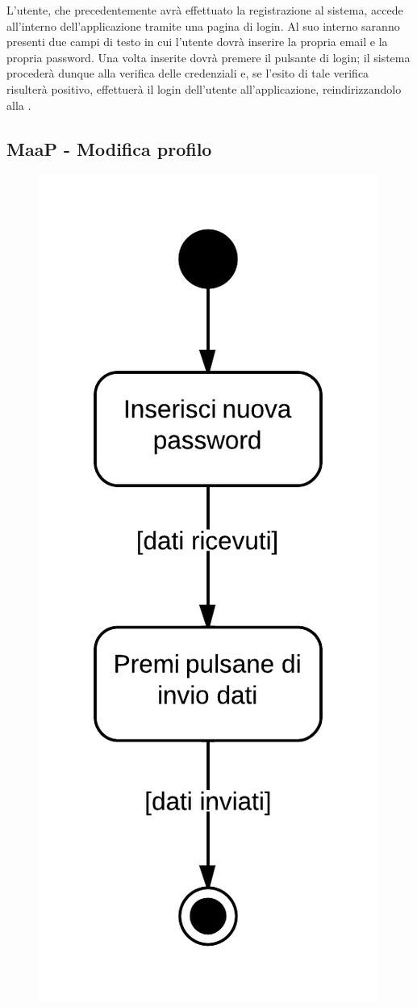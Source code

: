 L'utente, che precedentemente avrà effettuato la registrazione al sistema, accede all'interno dell'applicazione tramite una pagina di login. Al suo interno saranno presenti due campi di testo in cui l'utente dovrà inserire la propria email e la propria password. Una volta inserite dovrà premere il pulsante di login; il sistema  procederà dunque alla verifica delle credenziali e, se l'esito di tale verifica risulterà positivo, effettuerà il login dell'utente all'applicazione, reindirizzandolo alla .

\subsection{MaaP - Modifica profilo}

\begin{figure}[H]
\centering
\includegraphics[scale=0.2]{uml/MaaP - Modifica profilo.png}

\end{figure}
